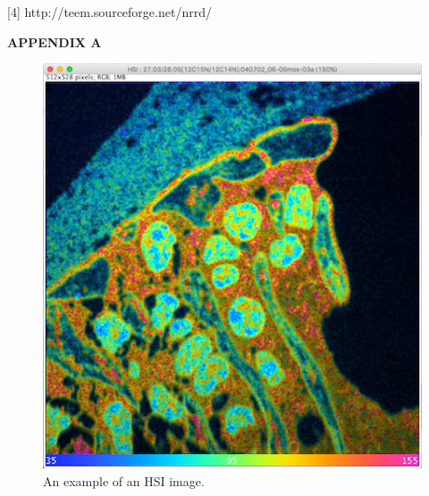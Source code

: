 \documentclass{article}
\begin{document}
	[4] http://teem.sourceforge.net/nrrd/

	\clearpage

\newpage
\begin{center}\LARGE{\textbf{APPENDIX A}}\end{center} 
\vfill
\begin{figure}[htp!]
\centering
\includegraphics[scale=1.0]{snapshot_HSI-Image.png}
\caption{An example of an HSI image.}
\end{figure}
\vfill
\end{document}
